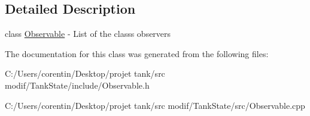\subsection{Detailed Description}
class \hyperlink{classstate_1_1_observable}{Observable} -\/ List of the class\textquotesingle{}s observers 

The documentation for this class was generated from the following files\+:\begin{DoxyCompactItemize}
\item 
C\+:/\+Users/corentin/\+Desktop/projet tank/src modif/\+Tank\+State/include/Observable.\+h\item 
C\+:/\+Users/corentin/\+Desktop/projet tank/src modif/\+Tank\+State/src/Observable.\+cpp\end{DoxyCompactItemize}

